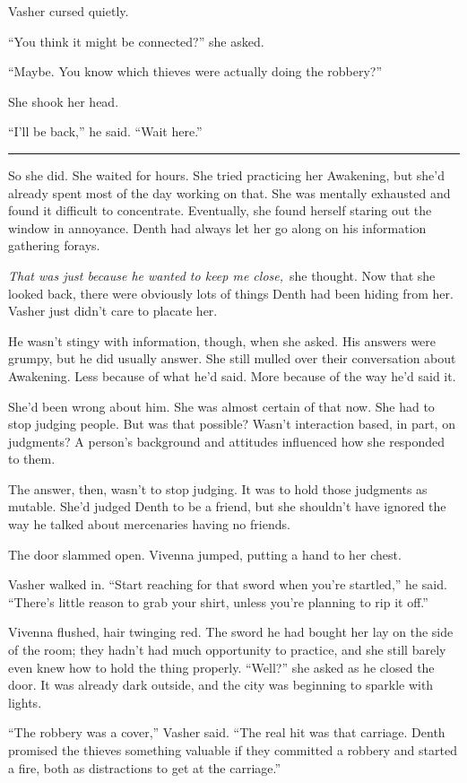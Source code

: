 Vasher cursed quietly.

“You think it might be connected?” she asked.

“Maybe. You know which thieves were actually doing the robbery?”

She shook her head.

“I’ll be back,” he said. “Wait here.”

\bigskip \hrule \bigskip

So she did. She waited for hours. She tried practicing her Awakening, but she’d already spent most of the day working on that. She was mentally exhausted and found it difficult to concentrate. Eventually, she found herself staring out the window in annoyance. Denth had always let her go along on his information gathering forays.

\textit{That was just because he wanted to keep me close,}~she thought. Now that she looked back, there were obviously lots of things Denth had been hiding from her. Vasher just didn’t care to placate her.

He wasn’t stingy with information, though, when she asked. His answers were grumpy, but he did usually answer. She still mulled over their conversation about Awakening. Less because of what he’d said. More because of the way he’d said it.

She’d been wrong about him. She was almost certain of that now. She had to stop judging people. But was that possible? Wasn’t interaction based, in part, on judgments? A person’s background and attitudes influenced how she responded to them.

The answer, then, wasn’t to stop judging. It was to hold those judgments as mutable. She’d judged Denth to be a friend, but she shouldn’t have ignored the way he talked about mercenaries having no friends.

The door slammed open. Vivenna jumped, putting a hand to her chest.

Vasher walked in. “Start reaching for that sword when you’re startled,” he said. “There’s little reason to grab your shirt, unless you’re planning to rip it off.”

Vivenna flushed, hair twinging red. The sword he had bought her lay on the side of the room; they hadn’t had much opportunity to practice, and she still barely even knew how to hold the thing properly. “Well?” she asked as he closed the door. It was already dark outside, and the city was beginning to sparkle with lights.

“The robbery was a cover,” Vasher said. “The real hit was that carriage. Denth promised the thieves something valuable if they committed a robbery and started a fire, both as distractions to get at the carriage.”

